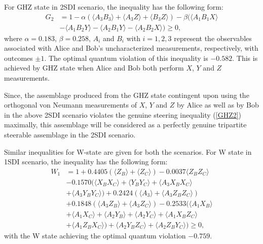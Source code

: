 \documentclass[reprint,superscriptaddress,nofootinbib,amsmath,amssymb,aps,pra,longbibliography]{revtex4-1}
\begin{document}
For GHZ state in 2SDI scenario, the inequality has the following form: 
\begin{align}
G_2 &= 1 - \alpha (\langle A_3B_3\rangle +  \langle A_3Z \rangle + \langle B_3Z \rangle) - \beta( \langle A_1B_1X \rangle \nonumber \\
& -  \langle A_1B_2Y\rangle -  \langle A_2B_1Y\rangle -   \langle A_2B_2X\rangle )\geq 0,
\label{GHZ2}
\end{align}
where $\alpha = 0.183$, $\beta = 0.258$, $A_i$ and $B_i$ with $i=1, 2, 3$ represent the observables associated with Alice and Bob's uncharacterized measurements, respectively, with outcomes $\pm 1$. The optimal quantum violation of this inequality is $-0.582$. This is achieved by GHZ state when Alice and Bob both perform $X$, $Y$ and $Z$ measurements. %

 Since, the assemblage produced from the GHZ state contingent upon using the orthogonal von Neumann measurements of $X$, $Y$ and $Z$ by Alice as well as by Bob in the above 2SDI scenario violates the genuine steering inequality (\ref{GHZ2}) maximally, this assemblage will be considered as a perfectly genuine tripartite steerable assemblage in the 2SDI scenario.

Similar inequalities for W-state are given for both the scenarios. For W state in 1SDI scenario, the inequality has the following form: 
\begin{align}
W_1 &= 1 + 0.4405(\langle Z_B \rangle + \langle Z_C \rangle) - 0.0037  \langle Z_BZ_C\rangle   \nonumber \\
& - 0.1570 ( \langle X_B X_C \rangle + \langle Y_B Y_C \rangle + \langle A_3 X_B X_C \rangle \nonumber \\
&+ \langle A_3 Y_B Y_C \rangle )   + 0.2424 ( \langle A_3 \rangle +   \langle A_3Z_BZ_C \rangle ) \nonumber \\
&+ 0.1848 ( \langle A_3Z_B\rangle + \langle A_3Z_C \rangle )  - 0.2533( \langle A_1X_B\rangle \nonumber \\
&+ \langle A_1X_C\rangle + \langle A_2Y_B\rangle + \langle A_2Y_C\rangle   + \langle A_1X_BZ_C\rangle \nonumber \\
&+ \langle A_1Z_BX_C\rangle ) + \langle A_2Y_BZ_C\rangle + \langle A_2Z_BY_C\rangle )  \geq 0,
\label{W1}
\end{align}
with the  W state achieving the optimal quantum violation $-0.759$. %
\end{document}
